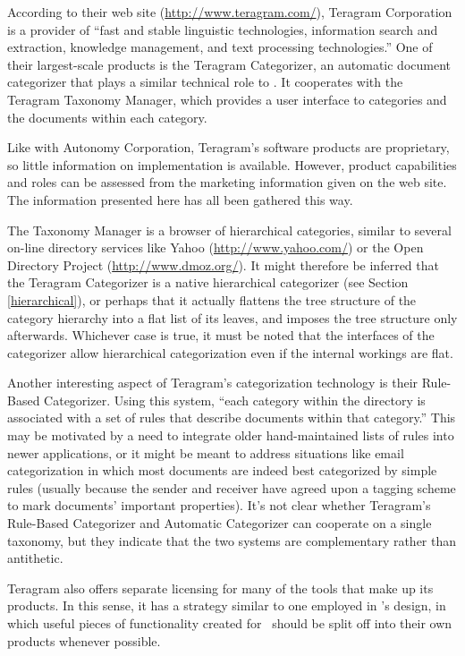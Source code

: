 According to their web site (\url{http://www.teragram.com/}), Teragram
Corporation is a provider of ``fast and stable linguistic
technologies, information search and extraction, knowledge management,
and text processing technologies.''  One of their largest-scale
products is the Teragram Categorizer, an automatic document
categorizer that plays a similar technical role to \aicat.
It cooperates with the Teragram Taxonomy Manager, which provides a
user interface to categories and the documents within each category.

Like with Autonomy Corporation, Teragram's software products are proprietary, so little
information on implementation is available.  However, product
capabilities and roles can be assessed from the marketing information
given on the web site.  The information presented here has all been
gathered this way.

The Taxonomy Manager is a browser of hierarchical categories, similar
to several on-line directory services like Yahoo
(\url{http://www.yahoo.com/}) or the Open Directory Project
(\url{http://www.dmoz.org/}).  It might therefore be inferred that the
Teragram Categorizer is a native hierarchical categorizer (see Section
\ref{hierarchical}), or perhaps that it
actually flattens the tree structure of the category
hierarchy into a flat list of its leaves, and imposes the tree
structure only afterwards.  Whichever case is true, it must be noted
that the interfaces of the categorizer allow hierarchical
categorization even if the internal workings are flat.

Another interesting aspect of Teragram's categorization technology is
their Rule-Based Categorizer.  Using this system, ``each category
within the directory is associated with a set of rules that describe
documents within that category.''  This may be motivated by a need to
integrate older hand-maintained lists of rules into newer
applications, or it might be meant to address situations like email
categorization in which most documents are indeed best categorized by
simple rules (usually because the sender and receiver have agreed upon
a tagging scheme to mark documents' important properties).  It's not
clear whether Teragram's Rule-Based Categorizer and Automatic
Categorizer can cooperate on a single taxonomy, but they indicate that
the two systems are complementary rather than antithetic.

Teragram also offers separate licensing for many of the tools that
make up its products.  In this sense, it has a strategy similar to one
employed in \aicat's design, in which useful pieces of
functionality created for \aicat\ should be split off into
their own products whenever possible.

